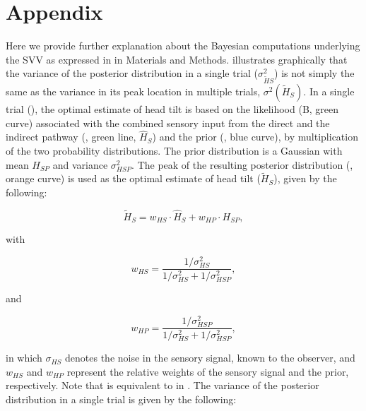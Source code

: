 
\section{Appendix}
\label{p1:sec:appendix}

Here we provide further explanation about the Bayesian computations underlying the SVV as expressed in  in Materials and Methods.  illustrates graphically that the variance of the posterior distribution in a single trial ($\sigma^2_{\tilde{H}S}$) is not simply the same as the variance in its peak location in multiple trials, $\sigma^2(\tilde{H}_S)$. In a single trial (), the optimal estimate of head tilt is based on the likelihood (B, green curve) associated with the combined sensory input from the direct and the indirect pathway (, green line, $\hat{H}_S$) and the prior (, blue curve), by multiplication of the two probability distributions. The prior distribution is a Gaussian with mean $H_{SP}$ and variance $\sigma^2_{HSP}$. The peak of the resulting posterior distribution (, orange curve) is used as the optimal estimate of head tilt ($\tilde{H}_S$), given by the following:

\begin{equation}
\label{p1:eqn13}
\tilde{H}_S = w_{HS} \cdot \hat{H}_S + w_{HP} \cdot H_{SP},
\end{equation}

with

\begin{equation}
\label{p1:eqn14}
w_{HS} = \frac{1 / \sigma^2_{HS}}{1 / \sigma^2_{HS} + 1 / \sigma^2_{HSP}},
\end{equation}

and

\begin{equation}
\label{p1:eqn15}
w_{HP} = \frac{1 / \sigma^2_{HSP}}{1 / \sigma^2_{HS} + 1 / \sigma^2_{HSP}},
\end{equation}

in which $\sigma_{HS}$ denotes the noise in the sensory signal, known to the observer, and $w_{HS}$ and $w_{HP}$ represent the relative weights of the sensory signal and the prior, respectively. Note that  is equivalent to  in . The variance of the posterior distribution in a single trial is given by the following:

